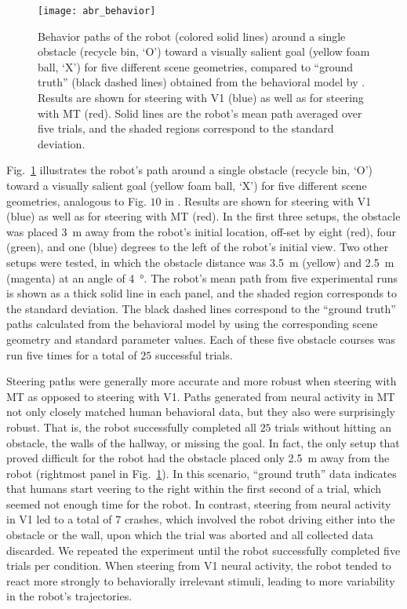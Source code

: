 \begin{figure}[t]
  \centering
  \texttt{[image: abr\_behavior]}
  \caption{
  Behavior paths of the robot (colored solid lines) around a single 
  obstacle (recycle bin, `O') toward a visually salient goal 
  (yellow foam ball, `X') for five different scene geometries, 
  compared to ``ground truth'' (black dashed lines) obtained from the
  behavioral model by \cite{FajenWarren2003}. 
  Results are shown for steering with \ac{V1} (blue) as well as for
  steering with \ac{MT} (red). Solid lines are the robot's mean path
  averaged over five trials, and the shaded regions correspond to the
  standard deviation.}
  \label{fig:ABR|behavior}
\end{figure}

Fig.~\ref{fig:ABR|behavior} illustrates the robot's path around a 
single obstacle (recycle bin, `O') toward a visually salient goal 
(yellow foam ball, `X') for five different scene geometries, 
analogous to Fig. $10$ in \cite{FajenWarren2003}.
Results are shown for steering with \ac{V1} (blue) as well as for 
steering with \ac{MT} (red). In the first three
setups, the obstacle was placed \SI{3}{\meter} away 
from the robot's initial location, off-set by eight (red), four (green), 
and one (blue) degrees
to the left of the robot's initial view. Two other setups were tested,
in which the obstacle distance was \SI{3.5}{\meter} (yellow)
and \SI{2.5}{\meter} (magenta) at an angle of \SI{4}{\degree}. 
The robot's mean path from five
experimental runs is shown as a thick solid line in each panel, and
the shaded region corresponds to the standard deviation. The black
dashed lines correspond to the ``ground truth'' paths calculated
from the behavioral model by \cite{FajenWarren2003} using the
corresponding scene geometry and standard parameter values.
Each of these five obstacle courses was run five times for a total
of $25$ successful trials.

Steering paths were generally more accurate and more robust
when steering with \ac{MT} as opposed to steering with \ac{V1}. Paths
generated from neural activity in \ac{MT} not only closely matched
human behavioral data, but they also were surprisingly robust.
That is, the robot successfully completed all $25$ trials without
hitting an obstacle, the walls of the hallway, or missing the goal.
In fact, the only setup that proved difficult for the robot had the
obstacle placed only \SI{2.5}{\meter} away from the robot 
(rightmost panel in Fig.~\ref{fig:ABR|behavior}). 
In this scenario, ``ground truth'' data indicates that humans
start veering to the right within the first second of a trial, which
seemed not enough time for the robot. In contrast, steering from
neural activity in \ac{V1} led to a total of $7$ crashes, which involved the
robot driving either into the obstacle or the wall, upon which the
trial was aborted and all collected data discarded. We repeated the
experiment until the robot successfully completed five trials per
condition. When steering from \ac{V1} neural activity, the robot tended
to react more strongly to behaviorally irrelevant stimuli, leading to
more variability in the robot's trajectories.

